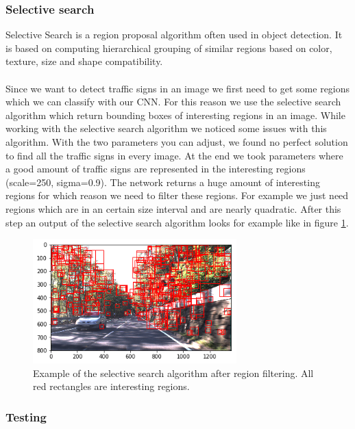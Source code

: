 \documentclass[12pt,a4paper,bibliography=totocnumbered,listof=totocnumbered]{scrartcl}
\begin{document}
\subsubsection{Selective search}

Selective Search is a region proposal algorithm often used in object detection. It is based on computing hierarchical grouping of similar regions based on color, texture, size and shape compatibility.\\\\

Since we want to detect traffic signs in an image we first need to get some regions which we can classify with our CNN. For this reason we use the selective search algorithm which return bounding boxes of interesting regions in an image. While working with the selective search algorithm we noticed some issues with this algorithm. With the two parameters you can adjust, we found no perfect solution to find all the traffic signs in every image. At the end we took parameters where a good amount of traffic signs are represented in the interesting regions (scale=250, sigma=0.9). The network returns a huge amount of interesting regions for which reason we need to filter these regions. For example we just need regions which are in an certain size interval and are nearly quadratic. After this step an output of the selective search algorithm looks for example like in figure \ref{fig:selective_search_example}.

\begin{figure}[htbp] 
  \centering
     \includegraphics[width=0.7\textwidth]{selective_search_example}
  \caption{Example of the selective search algorithm after region filtering. All red rectangles are interesting regions.}
  \label{fig:selective_search_example}
\end{figure}

\subsubsection{Testing}
\end{document}
